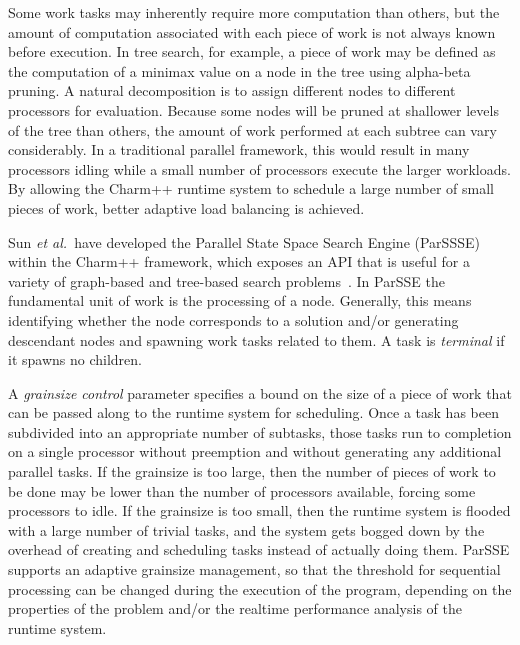 \documentclass[times, 10pt,twocolumn]{article}
\newcommand{\etal}{{\em et al.}\ }
\begin{document}
Some work tasks may inherently require more computation than others, but the
amount of computation associated with each piece of work is not always known
before execution.  In tree search, for example, a piece of work may be defined
as the computation of a minimax value on a node in the tree using alpha-beta
pruning.  A natural decomposition is to assign different nodes to different
processors for evaluation.  Because some nodes will be pruned at shallower
levels of the tree than others, the amount of work performed at each subtree can
vary considerably.  In a traditional parallel framework, this would result in
many processors idling while a small number of processors execute the larger
workloads. By allowing the {\sc Charm++} runtime system to schedule a large
number of small pieces of work, better adaptive load balancing is achieved. 

Sun \etal have developed the Parallel State Space Search Engine ({\sc ParSSSE})
within the {\sc Charm++} framework, which exposes an API that is useful for a
variety of graph-based and tree-based search problems~\cite{sun11adaptive}. In
{\sc ParSSE} the fundamental unit of work is the processing of a node.
Generally, this means identifying whether the node corresponds to a solution
and/or generating descendant nodes and spawning work tasks related to them. A
task is {\em terminal} if it spawns no children. 

A {\em grainsize control} parameter specifies a bound on the size of a piece of
work that can be passed along to the runtime system for scheduling.  Once a
task has been subdivided into an appropriate number of subtasks, those tasks
run to completion on a single processor without preemption and without generating
any additional parallel tasks.  If the grainsize is too large, then the number
of pieces of work to be done may be lower than the number of processors
available, forcing some processors to idle.  If the grainsize is too small,
then the runtime system is flooded with a large number of trivial tasks, and
the system gets bogged down by the overhead of creating and scheduling tasks
instead of actually doing them.  {\sc ParSSE} supports an adaptive grainsize
management, so that the threshold for sequential processing can be changed
during the execution of the program, depending on the properties of the problem
and/or the realtime performance analysis of the runtime system.
\end{document}
